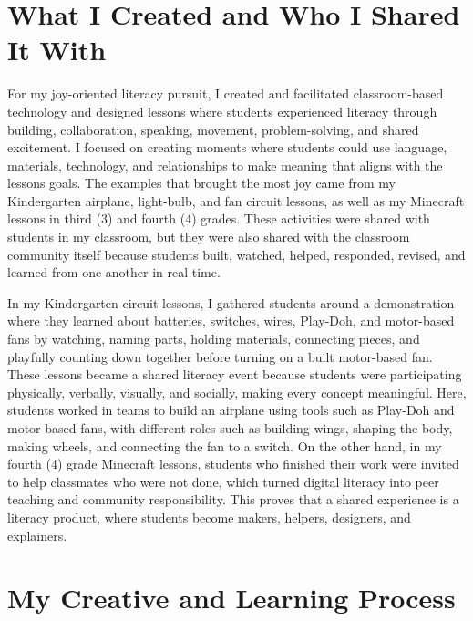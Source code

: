 \documentclass[11pt]{article}
\begin{document}
\section*{What I Created and Who I Shared It With}

For my joy-oriented literacy pursuit, I created and facilitated classroom-based technology and designed lessons where students experienced literacy through building, collaboration, speaking, movement, problem-solving, and shared excitement. I focused on creating moments where students could use language, materials, technology, and relationships to make meaning that aligns with the lessons goals. The examples that brought the most joy came from my Kindergarten airplane, light-bulb, and fan circuit lessons, as well as my Minecraft lessons in third (3) and fourth (4) grades. These activities were shared with students in my classroom, but they were also shared with the classroom community itself because students built, watched, helped, responded, revised, and learned from one another in real time.

In my Kindergarten circuit lessons, I gathered students around a demonstration where they learned about batteries, switches, wires, Play-Doh, and motor-based fans by watching, naming parts, holding materials, connecting pieces, and playfully counting down together before turning on a built motor-based fan. These lessons became a shared literacy event because students were participating physically, verbally, visually, and socially, making every concept meaningful. Here, students worked in teams to build an airplane using tools such as Play-Doh and motor-based fans, with different roles such as building wings, shaping the body, making wheels, and connecting the fan to a switch. On the other hand, in my fourth (4) grade Minecraft lessons, students who finished their work were invited to help classmates who were not done, which turned digital literacy into peer teaching and community responsibility. This proves that a shared experience is a literacy product, where students become makers, helpers, designers, and explainers.

\section*{My Creative and Learning Process}
\end{document}
